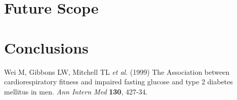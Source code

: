 \documentclass[12pt]{article}
\begin{document}
\part{Future Scope}
\newpage
\part{Conclusions}
\clearpage

\newpage
\begin{thebibliography}{}

Wei M, Gibbons LW, Mitchell TL \textit{et al}. (1999) The Association between cardiorespiratory fitness and impaired fasting glucose and type 2 diabetes mellitus in men. \textit{Ann Intern Med} \textbf{130}, 427-34.

\end{thebibliography}
\end{document}
